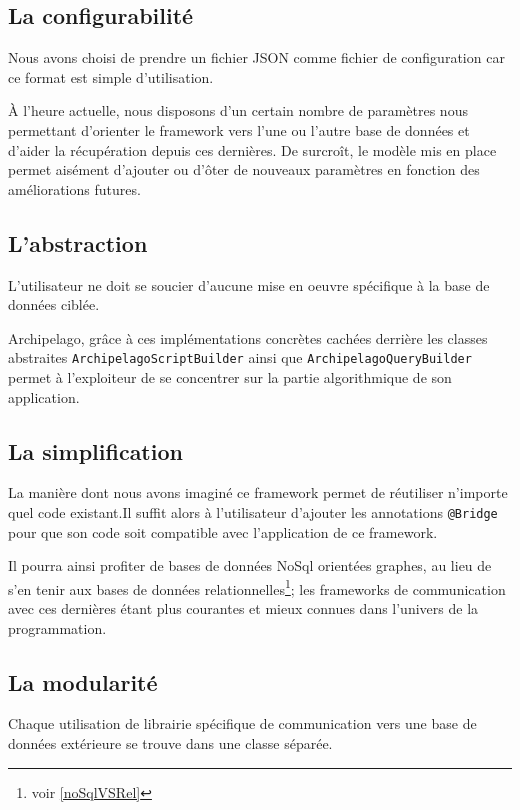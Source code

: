 \documentclass[a4paper,fleqn,12pt]{report}
\begin{document}
\subsection{La configurabilité}

Nous avons choisi de prendre un fichier JSON comme fichier de configuration car ce format est simple d'utilisation. 

\`A l'heure actuelle, nous disposons d'un certain nombre de paramètres nous permettant d'orienter le framework vers l'une ou l'autre base de données et d'aider la récupération depuis ces dernières. De surcroît, le modèle mis en place permet aisément d'ajouter ou d'ôter de nouveaux paramètres en fonction des améliorations futures. 

\subsection{L'abstraction}

L'utilisateur ne doit se soucier d'aucune mise en oeuvre spécifique à la base de données ciblée. 

Archipelago, grâce à ces  implémentations concrètes cachées derrière les classes abstraites \texttt{ArchipelagoScriptBuilder} ainsi que \texttt{ArchipelagoQueryBuilder} permet à l'exploiteur de se concentrer sur la partie algorithmique de son application.

\subsection{La simplification}

La manière dont nous avons imaginé ce framework permet de réutiliser n'importe quel code existant.Il suffit alors à l'utilisateur d'ajouter les annotations \texttt{@Bridge} pour que son code soit compatible avec l'application de ce framework. 

Il pourra ainsi profiter de bases de données NoSql orientées graphes, au lieu de s'en tenir aux bases de données relationnelles\footnote{voir \ref{noSqlVSRel}}; les frameworks de communication avec ces dernières étant plus courantes et mieux connues dans l'univers de la programmation.

\subsection{La modularité}

Chaque utilisation de librairie spécifique de communication vers une base de données extérieure se trouve dans une classe séparée.
\end{document}
